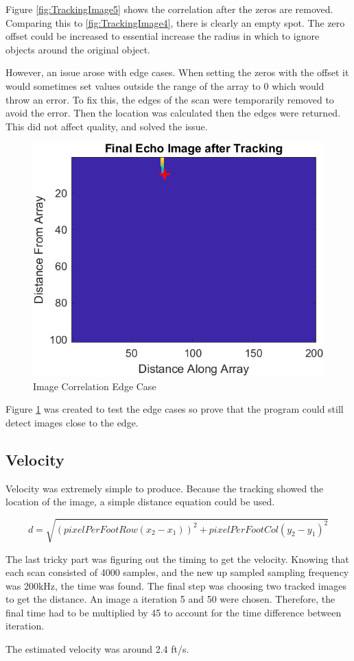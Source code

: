 Figure \ref{fig:TrackingImage5} shows the correlation after the zeros are removed. Comparing this to \ref{fig:TrackingImage4}, there is clearly an empty spot. The zero offset could be increased to essential increase the radius in which to ignore objects around the original object.

However, an issue arose with edge cases. When setting the zeros with the offset it would sometimes set values outside the range of the array to 0 which would throw an error. To fix this, the edges of the scan were temporarily removed to avoid the error. Then the location was calculated then the edges were returned. This did not affect quality, and solved the issue.

\begin{figure}[H]
    \centering
    \includegraphics[width=0.5\linewidth]{figures/TrackingImage6.png}
    \caption{Image Correlation Edge Case}
    \label{fig:TrackingImage6}
\end{figure}

Figure \ref{fig:TrackingImage6} was created to test the edge cases so prove that the program could still detect images close to the edge.

\subsection{Velocity}

Velocity was extremely simple to produce. Because the tracking showed the location of the image, a simple distance equation could be used.

\begin{equation}
    d = \sqrt{(pixelPerFootRow(x_{2} - x_{1}))^{2} + pixelPerFootCol(y_{2} - y_{1})^{2}}
    \label{eq:distanceEQ}
\end{equation}

The last tricky part was figuring out the timing to get the velocity. Knowing that each scan consisted of 4000 samples, and the new up sampled sampling frequency was 200kHz, the time was found. The final step was choosing two tracked images to get the distance. An image a iteration 5 and 50 were chosen. Therefore, the final time had to be multiplied by 45 to account for the time difference between iteration.

The estimated velocity was around 2.4 ft/s.


